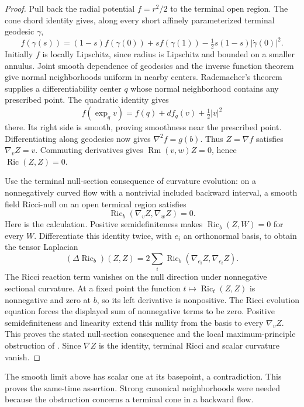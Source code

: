 \begin{proof}
Pull back the radial potential $f=r^2/2$ to the terminal open region.
The cone chord identity gives, along every short affinely parameterized
terminal geodesic $\gamma$,
\[
 f(\gamma(s))=(1-s)f(\gamma(0))+sf(\gamma(1))
                  -\tfrac12s(1-s)|\dot\gamma(0)|^2.
\]
Initially $f$ is locally Lipschitz, since radius is Lipschitz and bounded
on a smaller annulus. Joint smooth dependence of geodesics and the inverse
function theorem give normal neighborhoods uniform in nearby centers.
Rademacher's theorem supplies a differentiability center $q$ whose normal
neighborhood contains any prescribed point. The quadratic identity gives
\[
 f(\exp_qv)=f(q)+df_q(v)+\tfrac12|v|^2
\]
there. Its right side is smooth, proving smoothness near the prescribed
point. Differentiating along geodesics now gives $\nabla^2f=g(b)$.
Thus $Z=\nabla f$ satisfies
$\nabla_vZ=v$. Commuting derivatives gives
$\operatorname{Rm}(v,w)Z=0$, hence $\operatorname{Ric}(Z,Z)=0$.

Use the terminal null-section consequence of curvature evolution: on a
nonnegatively curved flow with a nontrivial included backward interval, a
smooth field Ricci-null on an open terminal region satisfies
\[
 \operatorname{Ric}_b(\nabla_vZ,\nabla_wZ)=0.
\]
Here is the calculation. Positive semidefiniteness makes
$\operatorname{Ric}_b(Z,W)=0$ for every $W$. Differentiate this identity
twice, with $e_i$ an orthonormal basis, to obtain the tensor Laplacian
\[
 (\Delta\operatorname{Ric}_b)(Z,Z)
       =2\sum_i\operatorname{Ric}_b(\nabla_{e_i}Z,\nabla_{e_i}Z).
\]
The Ricci reaction term vanishes on the null direction under nonnegative
sectional curvature. At a fixed point the function
$t\mapsto\operatorname{Ric}_t(Z,Z)$ is nonnegative and zero at $b$,
so its left derivative is nonpositive. The Ricci evolution equation
forces the displayed sum of nonnegative terms to be zero.
Positive semidefiniteness and linearity extend this nullity from the basis
to every $\nabla_vZ$. This proves the stated null-section consequence
and the local maximum-principle obstruction of
\cite[Proposition 4.22, p. 74]{MT2007}.
Since $\nabla Z$ is the identity, terminal Ricci and scalar curvature vanish.
\end{proof}

The smooth limit above has scalar one at its basepoint, a contradiction.
This proves the same-time assertion. Strong canonical neighborhoods were
needed because the obstruction concerns a terminal cone in a backward flow.

